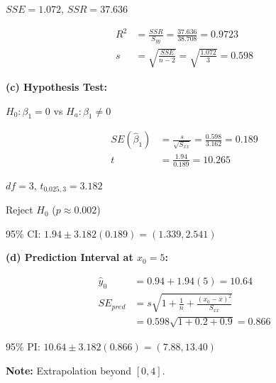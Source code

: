 \documentclass[10pt,twocolumn]{article}
\begin{document}
\(SSE = 1.072\), \(SSR = 37.636\)

\begin{align*}
R^2 &= \frac{SSR}{S_{yy}} = \frac{37.636}{38.708} = \boxed{0.9723} \\
s &= \sqrt{\frac{SSE}{n-2}} = \sqrt{\frac{1.072}{3}} = \boxed{0.598}
\end{align*}

\textbf{(c) Hypothesis Test:}

\(H_0: \beta_1 = 0\) vs \(H_a: \beta_1 \neq 0\)

\begin{align*}
SE(\hat{\beta}_1) &= \frac{s}{\sqrt{S_{xx}}} = \frac{0.598}{3.162} = 0.189 \\
t &= \frac{1.94}{0.189} = \boxed{10.265}
\end{align*}

\(df=3\), \(t_{0.025,3} = 3.182\)

Reject \(H_0\) (\(p \approx 0.002\))

95\% CI: \(1.94 \pm 3.182(0.189) = \boxed{(1.339, 2.541)}\)

\textbf{(d) Prediction Interval at \(x_0=5\):}

\begin{align*}
\hat{y}_0 &= 0.94 + 1.94(5) = \boxed{10.64} \\
SE_{pred} &= s\sqrt{1 + \frac{1}{n} + \frac{(x_0-\bar{x})^2}{S_{xx}}} \\
&= 0.598\sqrt{1 + 0.2 + 0.9} = \boxed{0.866}
\end{align*}

95\% PI: \(10.64 \pm 3.182(0.866) = \boxed{(7.88, 13.40)}\)

\textbf{Note:} Extrapolation beyond \([0,4]\).
\end{document}
